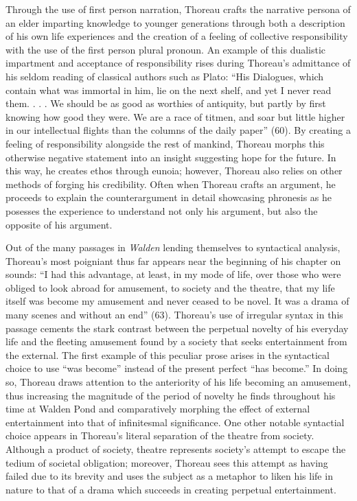 \documentclass[12pt]{article}
\newcommand{\tq}[2]{
    \fancyhead[L]{\emph{Walden}: Reading Journals}
    \fancyhead[R]{TQ:\ #1 $\vert$ CH: #2}
}
\begin{document}
Through the use of first person narration, Thoreau crafts the narrative persona of an elder imparting knowledge to younger generations through both a description of his own life experiences and the creation of a feeling of collective responsibility with the use of the first person plural pronoun. An example of this dualistic impartment and acceptance of responsibility rises during Thoreau's admittance of his seldom reading of classical authors such as Plato: ``His Dialogues, which contain what was immortal in him, lie on the next shelf, and yet I never read them. . . . We should be as good as worthies of antiquity, but partly by first knowing how good they were. We are a race of titmen, and soar but little higher in our intellectual flights than the columns of the daily paper'' (60). By creating a feeling of responsibility alongside the rest of mankind, Thoreau morphs this otherwise negative statement into an insight suggesting hope for the future. In this way, he creates ethos through eunoia; however, Thoreau also relies on other methods of forging his credibility. Often when Thoreau crafts an argument, he proceeds to explain the counterargument in detail showcasing phronesis as he posesses the experience to understand not only his argument, but also the opposite of his argument.

\newpage
\tq{8}{4 - Sounds}


 Out of the many passages in \emph{Walden} lending themselves to syntactical analysis, Thoreau's most poigniant thus far appears near the beginning of his chapter on sounds: ``I had this advantage, at least, in my mode of life, over those who were obliged to look abroad for amusement, to society and the theatre, that my life itself was become my amusement and never ceased to be novel. It was a drama of many scenes and without an end'' (63). Thoreau's use of irregular syntax in this passage cements the stark contrast between the perpetual novelty of his everyday life and the fleeting amusement found by a society that seeks entertainment from the external. The first example of this peculiar prose arises in the syntactical choice to use ``was become'' instead of the present perfect ``has become.'' In doing so, Thoreau draws attention to the anteriority of his life becoming an amusement, thus increasing the magnitude of the period of novelty he finds throughout his time at Walden Pond and comparatively morphing the effect of external entertainment into that of infinitesmal significance. One other notable syntactial choice appears in Thoreau's literal separation of the theatre from society. Although a product of society, theatre represents society's attempt to escape the tedium of societal obligation; moreover, Thoreau sees this attempt as having failed due to its brevity and uses the subject as a metaphor to liken his life in nature to that of a drama which succeeds in creating perpetual entertainment.
\end{document}
